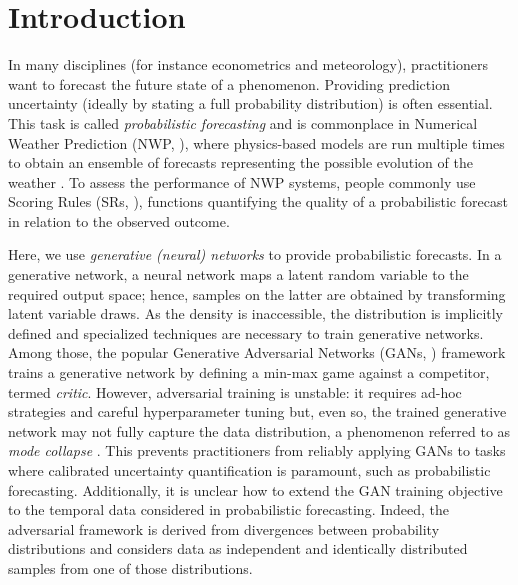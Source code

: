 \documentclass[twoside,11pt]{article}
\begin{document}
	
	
	\section{Introduction}
	
	In many disciplines (for instance econometrics and meteorology), practitioners want to forecast the future state of a phenomenon. Providing prediction uncertainty (ideally by stating a full probability distribution) is often essential.
	This task is called \textit{probabilistic forecasting} \citep{gneiting2014probabilistic} and is commonplace in Numerical Weather Prediction (NWP, \citealp{palmer2012towards}), where physics-based models are run multiple times to obtain an ensemble of forecasts representing the possible evolution of the weather \citep{leutbecher2008ensemble}. To assess the performance of NWP systems, people commonly use Scoring Rules (SRs, \citealp{gneiting2007strictly}), functions quantifying the quality of a probabilistic forecast in relation to the observed outcome. 
	
	
	
	
	Here, we use \textit{generative (neural) networks} to provide probabilistic forecasts. In a generative network, a neural network maps a latent random variable to the required output space; hence, samples on the latter are obtained by transforming latent variable draws. As the density is inaccessible, the distribution is implicitly defined and specialized techniques are necessary to train generative networks.
	Among those, the popular Generative Adversarial Networks (GANs, \citealp{goodfellow2014generative, mirza2014conditional, nowozin2016f, arjovsky2017wasserstein}) framework trains a generative network by defining a min-max game against a competitor, termed \textit{critic}. However, adversarial training is unstable: it requires ad-hoc strategies \citep{gulrajani2017improved} and careful hyperparameter tuning \citep{salimans2016improved} but, even so, the trained generative network may not fully capture the data distribution, a phenomenon referred to as \textit{mode collapse} \citep{goodfellow2016nips,isola2017image, arora2017generalization,bellemare2017cramer, arora2017gans,richardson2018gans}. This prevents practitioners from reliably applying GANs to tasks where calibrated uncertainty quantification is paramount, such as probabilistic forecasting.
	Additionally, it is unclear how to extend the GAN training objective to the temporal data considered in probabilistic forecasting. Indeed, the adversarial framework is derived from divergences between probability distributions and considers data as independent and identically distributed samples from one of those distributions. %
	
\end{document}
